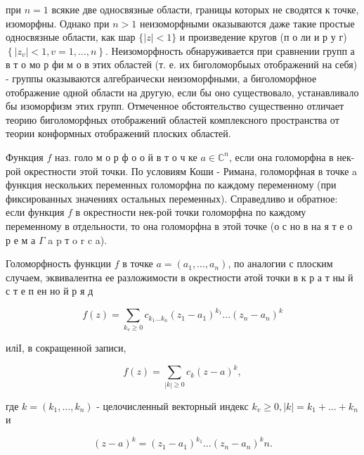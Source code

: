 \documentclass[10pt]{article}
\begin{document}
при $n=1$ всякие две односвязные области, границы которых не сводятся к точке, изоморфны. Однако при $n>1$ неизоморфными оказываются даже такие простые односвязные области, как шар $\{|z|<1\}$ и произведение кругов (п о ли и р у г) $\left\{\left|z_{v}\right|<1, v=1, \ldots, n\right\}$. Неизоморфность обнаруживается при сравнении групп а в т о мо р фи м о в этих областей (т. е. их биголоморбыых отображений на себя) - группы оказываются алгебраически неизоморфными, а биголоморфное отображение одной области на другую, если бы оно существовало, устанавливало бы изоморфизм этих групп. Отмеченное обстоятельство существенно отличает теорию биголоморфных отображений областей комплексного пространства от теории конформных отображений плоских областей.



Функция $f$ наз. голо м о р ф о о й в т о ч ке $a \in \mathbb{C}^{n}$, если она голоморфна в нек-рой окрестности этой точки. По условиям Коши - Римана, голоморфная в точке a функция нескольких переменных голоморфна по каждому переменному (при фиксированных значениях остальных переменных). Справедливо и обратное: если функция $f$ в окрестности нек-рой точки голоморфна по каждому переменному в отдельности, то она голоморфна в этой точке (о с но в на я т е о р е м а $\Gamma$ a p т o r c a).



Голоморфность функции $f$ в точке $a=\left(a_{1}, \ldots, a_{n}\right)$, по аналогии с плоским случаем, эквивалентна ее разложимости в окрестности әтой точки в к р а т ны й с т е п ен но й р я д



\[

f(z)=\sum_{k_{v} \geqslant 0} c_{k_{1} \ldots k_{n}}\left(z_{1}-a_{1}\right)^{k_{1}} \ldots\left(z_{n}-a_{n}\right)^{k}

\]



иліІ, в сокращенной записи,



\[

f(z)=\sum_{|k| \geqslant 0} c_{k}(z-a)^{k},

\]



где $k=\left(k_{1}, \ldots, k_{n}\right)$ - целочисленный векторный индекс $k_{v} \geqslant 0,|k|=k_{1}+\ldots+k_{n}$ и



\[

(z-a)^{k}=\left(z_{1}-a_{1}\right)^{k_{1}} \ldots\left(z_{n}-a_{n}\right)^{k} n .

\]
\end{document}
